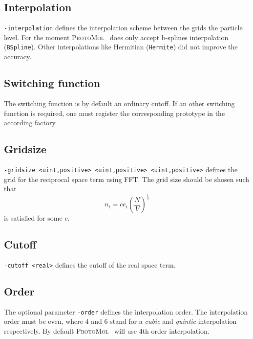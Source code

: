 \documentclass[11pt]{article}
\newcommand{\ProtoMol}{\textsc{ProtoMol }}
\begin{document}
\subsection{Interpolation}

\texttt{-interpolation} defines the interpolation scheme between the
grids the particle level. For the moment \ProtoMol\
does only accept b-splines interpolation (\texttt{BSpline}). Other
interpolations like Hermitian (\texttt{Hermite}) did not improve the
accuracy.

\subsection{Switching function}
The switching function is by default an ordinary cutoff. If an other
switching function is required, one must register the corresponding
prototype in the according factory.

\subsection{Gridsize}
\texttt{-gridsize <uint,positive> <uint,positive> <uint,positive>} defines the grid for the
reciprocal space term using FFT. The grid size should be shosen such that
\begin{equation}
  n_i = c e_i  \left ( \frac{N}{V} \right )
^\frac{1}{3} 
\end{equation}
is satisfied for some $c$. 

\subsection{Cutoff}
\texttt{-cutoff <real>} defines the cutoff of the real space term.

\subsection{Order}

The optional parameter \texttt{-order} defines the interpolation order. The interpolation
order must be even, where 4 and 6 stand for a {\it cubic} and 
{\it quintic} interpolation respectively. By default \ProtoMol\ will use 4th order interpolation.
\end{document}
